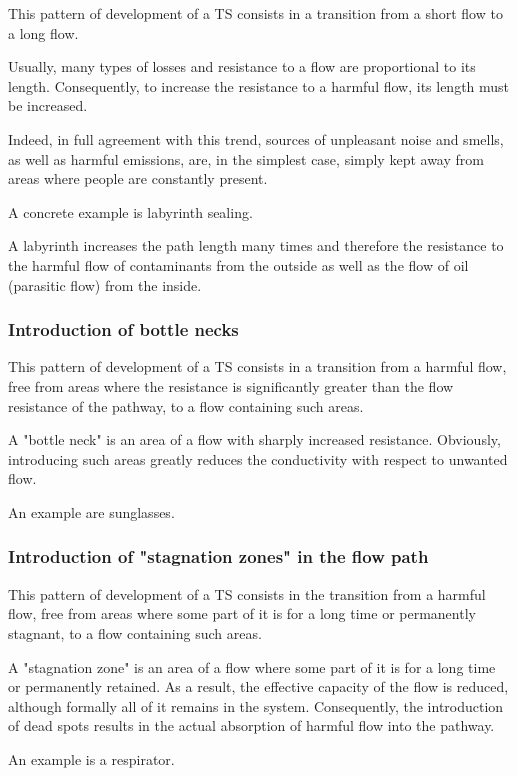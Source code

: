 \documentclass[a4paper,11pt]{article}
\begin{document}
This pattern of development of a TS consists in a transition from a short flow
to a long flow.

Usually, many types of losses and resistance to a flow are proportional to its
length. Consequently, to increase the resistance to a harmful flow, its length
must be increased.

Indeed, in full agreement with this trend, sources of unpleasant noise and
smells, as well as harmful emissions, are, in the simplest case, simply kept
away from areas where people are constantly present.

A concrete example is labyrinth sealing.

A labyrinth increases the path length many times and therefore the resistance
to the harmful flow of contaminants from the outside as well as the flow of
oil (parasitic flow) from the inside.

\subsubsection{Introduction of bottle necks}

This pattern of development of a TS consists in a transition from a harmful
flow, free from areas where the resistance is significantly greater than the
flow resistance of the pathway, to a flow containing such areas.

A "bottle neck" is an area of a flow with sharply increased resistance.
Obviously, introducing such areas greatly reduces the conductivity with
respect to unwanted flow.

An example are sunglasses.

\subsubsection{Introduction of "stagnation zones" in the flow path}

This pattern of development of a TS consists in the transition from a harmful
flow, free from areas where some part of it is for a long time or permanently
stagnant, to a flow containing such areas.

A "stagnation zone" is an area of a flow where some part of it is for a long
time or permanently retained. As a result, the effective capacity of the flow
is reduced, although formally all of it remains in the system. Consequently,
the introduction of dead spots results in the actual absorption of harmful
flow into the pathway.

An example is a respirator.
\end{document}
